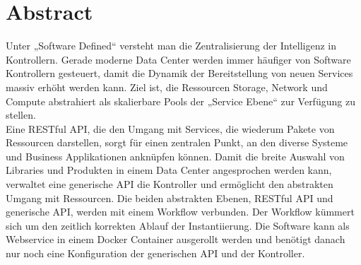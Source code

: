 \chapter*{Abstract}

Unter „Software Defined“ versteht man die Zentralisierung der Intelligenz in Kontrollern. Gerade moderne Data Center werden immer häufiger von Software Kontrollern gesteuert, damit die Dynamik der Bereitstellung von neuen Services massiv erhöht werden kann. Ziel ist, die Ressourcen Storage, Network und Compute abstrahiert als skalierbare Pools der „Service Ebene“ zur Verfügung zu stellen.\\
Eine RESTful API, die den Umgang mit Services, die wiederum Pakete von Ressourcen darstellen, sorgt für einen zentralen Punkt, an den diverse Systeme und Business Applikationen anknüpfen können. Damit die breite Auswahl von Libraries und Produkten in einem Data Center angesprochen werden kann, verwaltet eine generische API die Kontroller und ermöglicht den abstrakten Umgang mit Ressourcen. Die beiden abstrakten Ebenen, RESTful API und generische API, werden mit einem \gls{Workflow} verbunden. Der \gls{Workflow} kümmert sich um den zeitlich korrekten Ablauf der Instantiierung. Die Software kann als Webservice in einem Docker Container ausgerollt werden und benötigt danach nur noch eine Konfiguration der generischen API und der Kontroller.